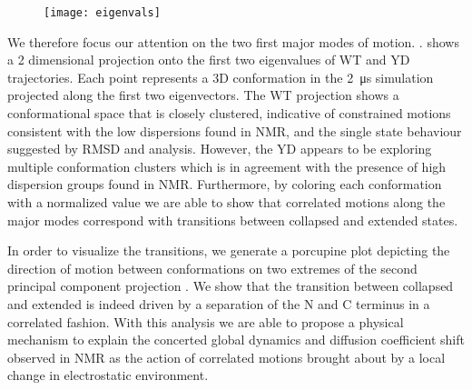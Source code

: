 \begin{figure}
\centering
	\texttt{[image: eigenvals]}
	\label{fig:eigenvalues}
\end{figure}


We therefore focus our attention on the two first major modes of motion. .  shows a 2 dimensional projection onto the first two eigenvalues of WT and YD trajectories. Each point represents a 3D conformation in the \SI{2}{\us} simulation projected along the first two eigenvectors. The WT projection shows a conformational space that is closely clustered, indicative of constrained motions consistent with the low dispersions found in NMR, and the single state behaviour suggested by RMSD and \diffusion analysis. However, the YD appears to be exploring  multiple conformation clusters which is in agreement with the presence of high dispersion groups found in NMR. Furthermore, by coloring each conformation with a normalized \diffusion value we are able to show that correlated motions along the major modes correspond with transitions between collapsed and extended states. 

\begin{figure}
	\thispagestyle{empty}
	\centering     %
	\clearpage
	\label{fig:pca}
\end{figure}

In order to visualize the transitions, we generate a porcupine plot depicting the direction of motion between conformations on two extremes of the second principal component projection .  We show that the transition between collapsed and extended is indeed driven by a separation of the N and C terminus in a correlated fashion.  With this analysis we are able to propose a physical mechanism to explain the concerted global dynamics and diffusion coefficient shift observed in NMR as the action of correlated motions brought about by a local change in electrostatic environment. 

